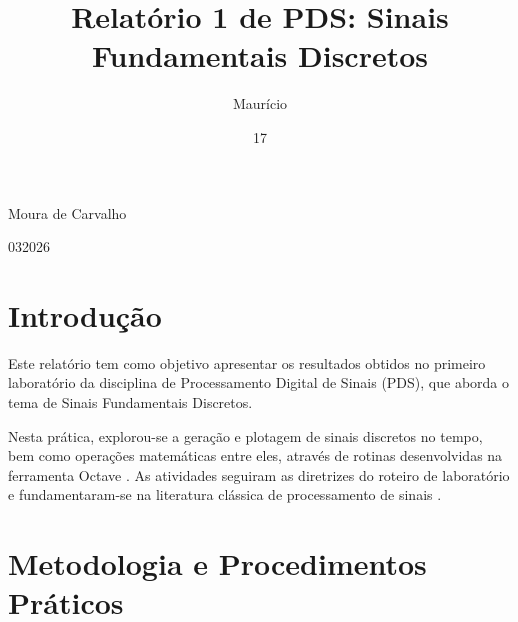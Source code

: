 \documentclass[tcc]{classe_uftex/uftex}
\begin{document}
  \title{Relatório 1 de PDS: Sinais Fundamentais Discretos}
  \author{Maurício}{Moura de Carvalho}

  
  \date{17}{03}{2026}
  

  
  \maketitle
  \frontmatter

  \tableofcontents 
  
  \mainmatter
  \setcounter{page}{1} %
  \onehalfspacing


\chapter{Introdução}

Este relatório tem como objetivo apresentar os resultados obtidos no primeiro laboratório da disciplina de Processamento Digital de Sinais (PDS), que aborda o tema de Sinais Fundamentais Discretos.

Nesta prática, explorou-se a geração e plotagem de sinais discretos no tempo, bem como operações matemáticas entre eles, através de rotinas desenvolvidas na ferramenta Octave \cite{octaveman}. As atividades seguiram as diretrizes do roteiro de laboratório \cite{roteiro01} e fundamentaram-se na literatura clássica de processamento de sinais \cite{oppenheim, ingle2017}.

\chapter{Metodologia e Procedimentos Práticos}
\end{document}
